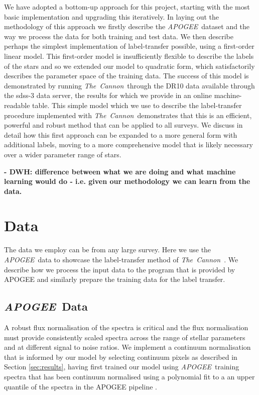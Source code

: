 \documentclass[12pt, preprint]{aastex}
\newcommand{\tc}{\textsl{The~Cannon}}
\newcommand{\apogee}{\textsl{APOGEE}}
\begin{document}
We have adopted a bottom-up approach for this project, starting with the most basic implementation and upgrading this iteratively.  In laying out the methodology of this approach we firstly describe the \apogee\ dataset and the way we process the data for both training and test data. We then describe perhaps the simplest implementation of label-transfer possible, using a first-order linear model. This first-order model is insufficiently flexible to describe the labels of the stars and so we extended our model to quadratic form, which satisfactorily describes the parameter space of the training data. The success of this model is demonstrated by running \tc\ through the DR10 data available through the sdss-3 data server, the results for which we provide in an online machine-readable table. This simple model which we use to describe the label-transfer procedure implemented with  \tc\, demonstrates that this is an efficient, powerful and robust method that can be applied to all surveys. We discuss in detail how this first approach can be expanded to a more general form with additional labels, moving to a more comprehensive model that is likely necessary over a wider parameter range of stars. 

\textbf{- DWH: difference between what we are doing and what machine learning would do - i.e. given our methodology we can learn from the data. }


\section{Data}

The data we employ can be from any large survey. Here we use the \apogee\ data to showcase the label-transfer method of \tc\ . We describe how we process the input data to the program that is provided by APOGEE and similarly prepare the training data for the label transfer. 

\subsection{\apogee\ Data}

A robust flux normalisation of the spectra is critical and the flux normalisation must provide consistently scaled spectra across the range of stellar parameters and at different signal to noise ratios. We implement a continuum normalisation that is informed by our model by selecting continuum pixels as described in Section \ref{sec:results}, having first trained our model using \apogee\ training spectra that has been continuum normalised using a polynomial fit to a an upper quantile of the spectra in the APOGEE pipeline \citep{Meszaros2013}. 
\end{document}
